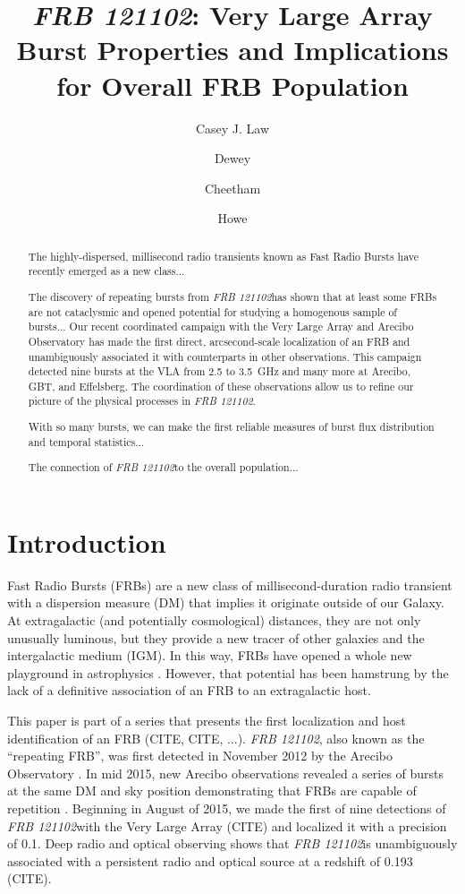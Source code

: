\documentclass{emulateapj}
\newcommand{\frb}{\emph{FRB 121102}}
\begin{document}
\title{\frb: Very Large Array Burst Properties and Implications for Overall FRB Population}
\shorttitle{\frb Burst Properties}

\author{Casey J. Law}
\author{Dewey}
\author{Cheetham}
\author{Howe}

\begin{abstract}
The highly-dispersed, millisecond radio transients known as Fast Radio Bursts have recently emerged as a new class...

The discovery of repeating bursts from \frb has shown that at least some FRBs are not cataclysmic and opened potential for studying a homogenous sample of bursts...
Our recent coordinated campaign with the Very Large Array and Arecibo Observatory has made the first direct, arcsecond-scale localization of an FRB and unambiguously associated it with counterparts in other observations. This campaign detected nine bursts at the VLA from 2.5 to 3.5~GHz and many more at Arecibo, GBT, and Effelsberg. The coordination of these observations allow us to refine our picture of the physical processes in \frb.

With so many bursts, we can make the first reliable measures of burst flux distribution and temporal statistics...

The connection of \frb to the overall population...

\end{abstract}

\section{Introduction}
Fast Radio Bursts (FRBs) are a new class of millisecond-duration radio transient with a dispersion measure (DM) that implies it originate outside of our Galaxy. At extragalactic (and potentially cosmological) distances, they are not only unusually luminous, but they provide a new tracer of other galaxies and the intergalactic medium (IGM). In this way, FRBs have opened a whole new playground in astrophysics \citep{}. However, that potential has been hamstrung by the lack of a definitive association of an FRB to an extragalactic host.

This paper is part of a series that presents the first localization and host identification of an FRB (CITE, CITE, ...). \frb, also known as the ``repeating FRB'', was first detected in November 2012 by the Arecibo Observatory \citep{2014ApJ...790..101S}. In mid 2015, new Arecibo observations revealed a series of bursts at the same DM and sky position demonstrating that FRBs are capable of repetition \citep{2016Natur.531..202S}. Beginning in August of 2015, we made the first of nine detections of \frb with the Very Large Array (CITE) and localized it with a precision of 0.1\arcsec. Deep radio and optical observing shows that \frb is unambiguously associated with a persistent radio and optical source at a redshift of 0.193 (CITE).
\end{document}
